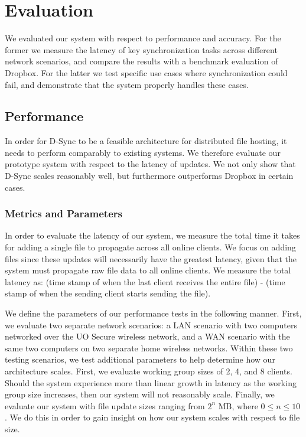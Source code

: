 \section{Evaluation}
\label{evaluation}
We evaluated our system with respect to performance and accuracy.
For the former we measure the latency of key synchronization tasks
across different network scenarios, and compare the results
with a benchmark evaluation of Dropbox. For the latter we test specific use cases
where synchronization could fail, and demonstrate that the system
properly handles these cases.

\subsection{Performance}
\label{evaluation.performance}
In order for D-Sync to be a feasible architecture
for distributed file hosting, it needs to perform comparably
to existing systems.
We therefore evaluate our prototype system with respect
to the latency of updates.
We not only show that D-Sync scales reasonably well,
but furthermore outperforms Dropbox in certain cases.

\subsubsection{Metrics and Parameters}
In order to evaluate the latency of our system,
we measure the total time it takes for adding a single file to 
propagate across all online clients.
We focus on adding files since these updates will necessarily
have the greatest latency, given that the system
must propagate raw file data to all online clients.
We measure the total latency as: (time stamp of when the last client receives
the entire file) - (time stamp of when the sending client starts sending the file).

We define the parameters of our performance tests in the following manner.
First, we evaluate two separate network scenarios: a LAN scenario with
two computers networked over the UO Secure wireless network,
and a WAN scenario with the same two computers on two separate home
wireless networks. 
Within these two testing scenarios,
we test additional parameters to help determine how our architecture scales.
First, we evaluate working group sizes of 2, 4, and 8 clients.
Should the system experience more than linear growth in latency
as the working group size increases, then our system will not reasonably scale.
Finally, we evaluate our system with file update sizes ranging
from $2^n$ MB, where $0 \leq n \leq 10$.
We do this in order to gain insight on how our system scales
with respect to file size.

